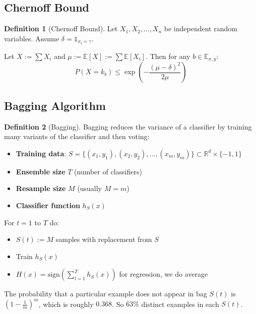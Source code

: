 \documentclass[12pt,a4paper]{article}
\theoremstyle{definition}
\newtheorem{definition}{Definition}[section]
\begin{document}
\subsection{Chernoff Bound}

\begin{definition}[Chernoff Bound]
Let $X_1, X_2, \ldots, X_n$ be independent random variables. Assume $\delta = \mathbb{1}_{x_i = \gamma}$.

Let $X := \sum X_i$ and $\mu := \mathbb{E}[X] := \sum \mathbb{E}[X_i]$. Then for any $b \in \mathbb{E}_{x,y}$:
\[
P(X = k_b) \leq \exp\left(-\frac{(\mu - \delta)^2}{2\mu}\right)
\]
\end{definition}

\subsection{Bagging Algorithm}

\begin{definition}[Bagging]
Bagging reduces the variance of a classifier by training many variants of the classifier and then voting:

\begin{itemize}
    \item \textbf{Training data}: $S = \{(x_1, y_1), (x_2, y_2), \ldots, (x_m, y_m)\} \subset \mathbb{R}^d \times \{-1, 1\}$
    
    \item \textbf{Ensemble size} $T$ (number of classifiers)
    
    \item \textbf{Resample size} $M$ (usually $M = m$)
    
    \item \textbf{Classifier function} $h_S(x)$
\end{itemize}

For $t = 1$ to $T$ do:
\begin{itemize}
    \item $S(t) := M$ samples with replacement from $S$
    \item Train $h_S(x)$
    \item $H(x) = \text{sign}\left(\sum_{l=1}^T h_S(x)\right)$ for regression, we do average
\end{itemize}

The probability that a particular example does not appear in bag $S(t)$ is $(1 - \frac{1}{m})^m$, which is roughly $0.368$. So $63\%$ distinct examples in each $S(t)$.
\end{definition}
\end{document}
